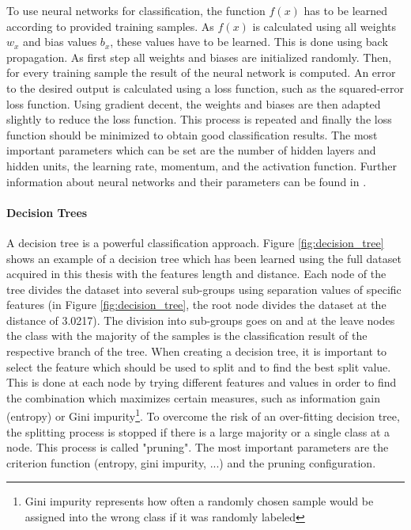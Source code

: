 To use neural networks for classification, the function $f(x)$ has to be learned according to provided training samples. As $f(x)$ is calculated using all weights $w_x$ and bias values $b_x$, these values have to be learned. This is done using back propagation. As first step all weights and biases are initialized randomly. Then, for every training sample the result of the neural network is computed. An error to the desired output is calculated using a loss function, such as the squared-error loss function. Using gradient decent, the weights and biases are then adapted slightly to reduce the loss function. This process is repeated and finally the loss function should be minimized to obtain good classification results. The most important parameters which can be set are the number of hidden layers and hidden units, the learning rate, momentum,  and the activation function. Further information about neural networks and their parameters can be found in \cite{Hall2016_DataMining_ML}.







\paragraph{Decision Trees}

A decision tree is a powerful classification approach. Figure \ref{fig:decision_tree} shows an example of a decision tree which has been learned using the full dataset acquired in this thesis with the features length and distance. Each node of the tree divides the dataset into several sub-groups using separation values of specific features (in Figure \ref{fig:decision_tree}, the root node divides the dataset at the distance of 3.0217). The division into sub-groups goes on and at the leave nodes the class with the majority of the samples is the classification result of the respective branch of the tree. When creating a decision tree, it is  important to select the feature which should be used to split and to find the best split value. This is done at each node by trying different features and values in order to find the combination which maximizes certain measures, such as information gain (entropy) or Gini impurity\footnote{Gini impurity represents how often a randomly chosen sample would be assigned into the wrong class if it was randomly labeled}. To overcome the risk of an over-fitting decision tree, the splitting process is stopped if there is a large majority or a single class at a node. This process is called "pruning". The most important parameters are the criterion function (entropy, gini impurity, ...) and the pruning configuration.

